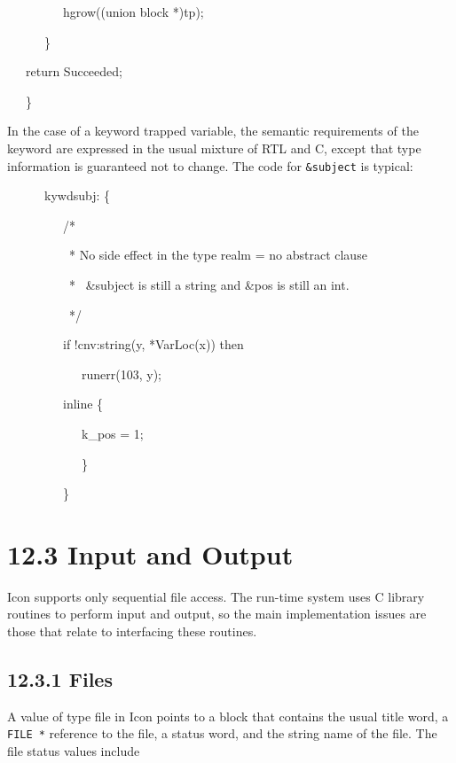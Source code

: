 {\ttfamily\mdseries
\ \ \ \ \ \ \ \ \ hgrow((union block *)tp);}

{\ttfamily\mdseries
\ \ \ \ \ \ \}}

{\ttfamily\mdseries
\ \ \ return Succeeded;}

{\ttfamily\mdseries
\ \ \ \}}

In the case of a keyword trapped variable, the semantic requirements
of the keyword are expressed in the usual mixture of RTL and C, except
that type information is guaranteed not to change. The code for
\texttt{\&subject} is typical:

{\ttfamily\mdseries
\ \ \ \ \ \ kywdsubj: \{}

{\ttfamily\mdseries
\ \ \ \ \ \ \ \ \ /*}

{\ttfamily\mdseries
\ \ \ \ \ \ \ \ \ \ * No side effect in the type realm = no abstract clause}

{\ttfamily\mdseries
\ \ \ \ \ \ \ \ \ \ * \ \&subject is still a string and \&pos is still an int.}

{\ttfamily\mdseries
\ \ \ \ \ \ \ \ \ \ */}

{\ttfamily\mdseries
\ \ \ \ \ \ \ \ \ if !cnv:string(y, *VarLoc(x)) then}

{\ttfamily\mdseries
\ \ \ \ \ \ \ \ \ \ \ \ runerr(103, y);}

{\ttfamily\mdseries
\ \ \ \ \ \ \ \ \ inline \{}

{\ttfamily\mdseries
\ \ \ \ \ \ \ \ \ \ \ \ k\_pos = 1;}

{\ttfamily\mdseries
\ \ \ \ \ \ \ \ \ \ \ \ \}}

{\ttfamily\mdseries
\ \ \ \ \ \ \ \ \ \}}


\section[12.3 Input and Output]{12.3 Input and Output}

Icon supports only sequential file access. The run-time system uses C
library routines to perform input and output, so the main
implementation issues are those that relate to interfacing these
routines.

\subsection[12.3.1 Files]{12.3.1 Files}

A value of type file in Icon points to a block that contains the usual
title word, a \texttt{FILE *} reference to the file, a status word,
and the string name of the file. The file status values include

